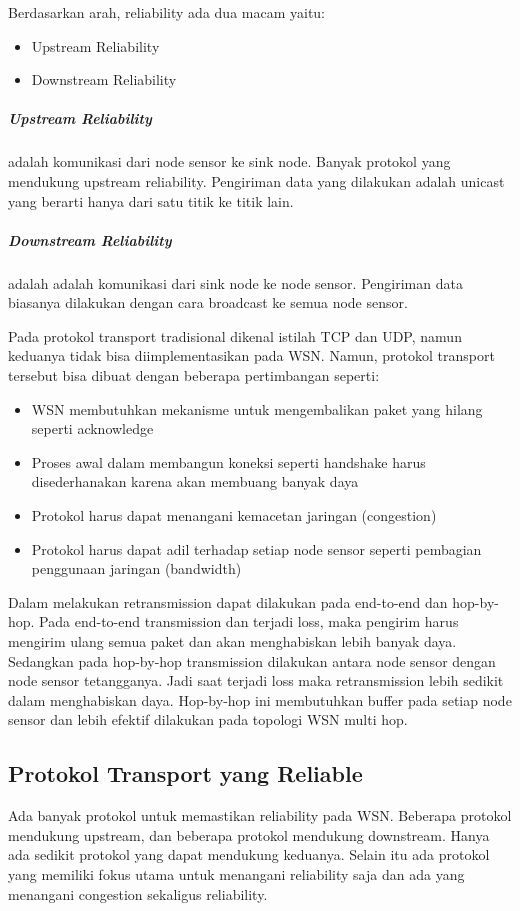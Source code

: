 Berdasarkan arah, reliability ada dua macam yaitu:
\begin{itemize}
	\item Upstream Reliability
	\item Downstream Reliability
\end{itemize}
\subparagraph{Upstream Reliability} adalah komunikasi dari node sensor ke sink node. Banyak protokol yang mendukung upstream reliability. Pengiriman data yang dilakukan adalah unicast yang berarti hanya dari satu titik ke titik lain.
\subparagraph{Downstream Reliability} adalah adalah komunikasi dari sink node ke node sensor. Pengiriman data biasanya dilakukan dengan cara broadcast ke semua node sensor. 

Pada protokol transport tradisional dikenal istilah TCP dan UDP, namun keduanya tidak bisa diimplementasikan pada WSN. Namun, protokol transport tersebut bisa dibuat dengan beberapa pertimbangan seperti:
\begin{itemize}
	\item WSN membutuhkan mekanisme untuk mengembalikan paket yang hilang seperti acknowledge
	\item Proses awal dalam membangun koneksi seperti handshake harus disederhanakan karena akan membuang banyak daya
	\item Protokol harus dapat menangani kemacetan jaringan (congestion)
	\item Protokol harus dapat adil terhadap setiap node sensor seperti pembagian penggunaan jaringan (bandwidth)
\end{itemize} 

Dalam melakukan retransmission dapat dilakukan pada end-to-end dan hop-by-hop. Pada end-to-end transmission dan terjadi loss, maka pengirim harus mengirim ulang semua paket dan akan menghabiskan lebih banyak daya. Sedangkan pada hop-by-hop transmission dilakukan antara node sensor dengan node sensor tetangganya. Jadi saat terjadi loss maka retransmission lebih sedikit dalam menghabiskan daya. Hop-by-hop ini membutuhkan buffer pada setiap node sensor dan lebih efektif dilakukan pada topologi WSN multi hop.


\subsection{Protokol Transport yang Reliable}
Ada banyak protokol untuk memastikan reliability pada WSN. Beberapa protokol mendukung upstream, dan beberapa protokol mendukung downstream. Hanya ada sedikit protokol yang dapat mendukung keduanya. Selain itu ada protokol yang memiliki fokus utama untuk menangani reliability saja dan ada yang menangani congestion sekaligus reliability. 

